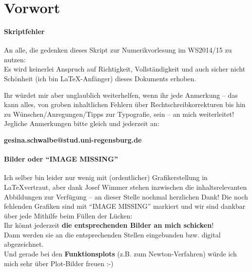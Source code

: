 %
%
%
%


\chapter*{Vorwort}
\subsubsection{Skriptfehler}
An alle, die gedenken dieses Skript zur Numerikvorlesung im WS2014/15 zu 
nutzen: \\
Es wird keinerlei Anspruch auf Richtigkeit, Vollständigkeit und auch sicher nicht Schönheit
(ich bin \LaTeX-Anfänger) dieses Dokuments erhoben.

Ihr würdet mir aber unglaublich weiterhelfen, wenn ihr jede Anmerkung 
-- das kann alles, von groben inhaltlichen 
Fehlern über Rechtschreibkorrekturen bis hin zu Wünschen/Anregungen/Tipps zur Typografie, sein --
an mich weiterleitet!\\

Jegliche Anmerkungen bitte gleich und jederzeit an: \\
\begin{center}
	\textbf{\large
		gesina.schwalbe@stud.uni-regensburg.de}
\end{center}
\hspace{1cm}


\subsubsection{Bilder oder \enquote{IMAGE MISSING}}
Ich selber bin leider nur wenig mit (ordentlicher) Grafikerstellung in \LaTeX vertraut,
aber dank Josef Wimmer stehen inzwischen die inhaltsrelevanten Abbildungen zur Verfügung
-- an dieser Stelle nochmal herzlichen Dank!
Die noch fehlenden Grafiken sind mit \enquote{IMAGE MISSING} markiert und
wir sind dankbar über jede Mithilfe beim Füllen der Lücken:\\
Ihr könnt jederzeit \textbf{die entsprechenden Bilder an mich schicken}!\\
Dann werden sie an die entsprechenden Stellen eingebunden
bzw. digital abgezeichnet. \\
Und gerade bei den \textbf{Funktionsplots} (z.B. zum Newton-Verfahren)
würde ich mich sehr über Plot-Bilder freuen :-)



